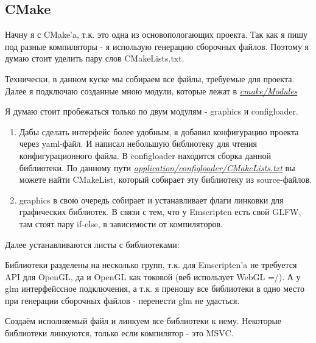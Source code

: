 \documentclass[12pt]{article}
\begin{document}
    \subsection{CMake}
    Начну я с CMake'a, т.к. это одна из основопологающих проекта.
    Так как я пишу под разные компиляторы - я использую генерацию сборочных файлов.
    Поэтому я думаю стоит уделить пару слов CMakeLists.txt.

    Технически, в данном куске мы собираем все файлы, требуемые для проекта.
    Далее я подключаю созданные мною модули, которые лежат в \emph{\href{https://github.com/JuiceFV/Emscripten_OpenGL/tree/master/cmake/Modules}{cmake/Modules}}

    Я думаю стоит пробежаться только по двум модулям - graphics и configloader.
    \begin{enumerate}
        \item Дабы сделать интерфейс более удобным, я добавил конфигурацию проекта
        через yaml-файл. И написал небольшую библиотеку для чтения конфигурационного файла.
        В configloader находится сборка данной библиотеки. По данному пути \emph{\href{https://github.com/JuiceFV/Emscripten_OpenGL/blob/master/application/configloader/CMakeLists.txt}{application/configloader/CMakeLists.txt}}
        вы можете найти CMakeList, который собирает эту библиотеку из source-файлов.
        \item graphics в свою очередь собирает и устанавливает флаги линковки для графических
        библиотек. В связи с тем, что у Emscripten есть свой GLFW, там стоят пару if-else, в зависимости от компиляторов.
    \end{enumerate}
    \noindent
    Далее устанавливаются листы с библиотеками:

    Библиотеки разделены на несколько групп, т.к. для Emscripten'a
    не требуется API для OpenGL, да и OpenGL как токовой (веб использует
    WebGL =/). А у glm интерфейссное подключения, а т.к. я преношу все библиотеки
    в одно место при генерации сборочных файлов - перенести glm не удасться.
    
    \noindent
    Создаём исполняемый файл и линкуем все библиотеки к нему. Некоторые библиотеки
    линкуются, только если компилятор - это MSVC. 

\end{document}

